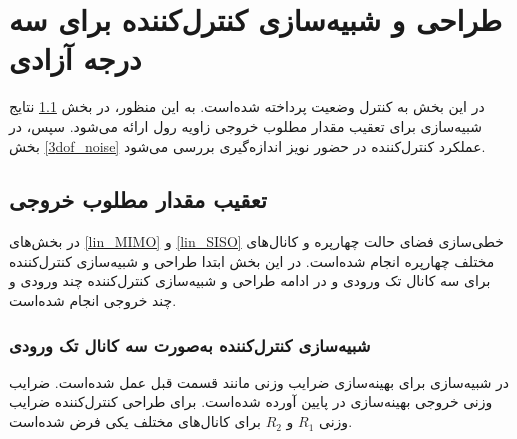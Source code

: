 \section{طراحی و شبیه‌سازی کنترل‌کننده برای سه درجه آزادی}\label{roll_pitch_yaw_lqidg_section_ll}
در این بخش به کنترل وضعیت پرداخته شده‌است. به این منظور، در بخش
\ref{3dof_regulator}
نتایج شبیه‌سازی برای تعقیب مقدار مطلوب خروجی زاویه رول ارائه می‌شود. سپس، در بخش
\ref{3dof_noise}
عملکرد کنترل‌کننده در  حضور نویز اندازه‌گیری بررسی می‌شود.
\subsection{تعقیب مقدار مطلوب خروجی}\label{3dof_regulator}


در بخش‌های
\ref{lin_MIMO}
و
\ref{lin_SISO}
خطی‌سازی فضای حالت چهارپره و کانال‌های مختلف چهارپره انجام شده‌است. در این بخش ابتدا طراحی و شبیه‌سازی کنترل‌کننده برای
سه کانال تک ورودی و در ادامه  طراحی و شبیه‌سازی کنترل‌کننده چند ورودی و چند خروجی
انجام شده‌است.

\subsubsection{شبیه‌سازی کنترل‌کننده به‌صورت سه کانال تک ورودی}\label{siso_sim}
 در شبیه‌سازی برای بهینه‌سازی ضرایب وزنی مانند قسمت قبل عمل شده‌است. ضرایب وزنی خروجی بهینه‌سازی در پایین آورده شده‌است. برای طراحی کنترل‌کننده
ضرایب وزنی
$R_1$
و
$R_2$
برای کانال‌های مختلف یکی فرض شده‌است.


